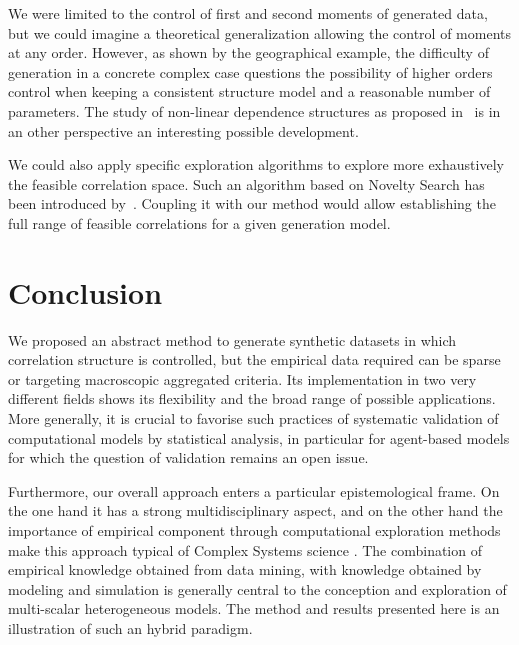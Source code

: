 \documentclass{article}
\begin{document}
We were limited to the control of first and second moments of generated data, but we could imagine a theoretical generalization allowing the control of moments at any order. However, as shown by the geographical example, the difficulty of generation in a concrete complex case questions the possibility of higher orders control when keeping a consistent structure model and a reasonable number of parameters. The study of non-linear dependence structures as proposed in~\cite{chicheportiche2013nested} is in an other perspective an interesting possible development.

We could also apply specific exploration algorithms to explore more exhaustively the feasible correlation space. Such an algorithm based on Novelty Search has been introduced by~\cite{10.1371/journal.pone.0138212}. Coupling it with our method would allow establishing the full range of feasible correlations for a given generation model.





\section*{Conclusion}


We proposed an abstract method to generate synthetic datasets in which correlation structure is controlled, but the empirical data required can be sparse or targeting macroscopic aggregated criteria. Its implementation in two very different fields shows its flexibility and the broad range of possible applications. More generally, it is crucial to favorise such practices of systematic validation of computational models by statistical analysis, in particular for agent-based models for which the question of validation remains an open issue.


Furthermore, our overall approach enters a particular epistemological frame. On the one hand it has a strong multidisciplinary aspect, and on the other hand the importance of empirical component through computational exploration methods make this approach typical of Complex Systems science \cite{2009arXiv0907.2221B}. The combination of empirical knowledge obtained from data mining, with knowledge obtained by modeling and simulation is generally central to the conception and exploration of multi-scalar heterogeneous models. The method and results presented here is an illustration of such an hybrid paradigm.
\end{document}
